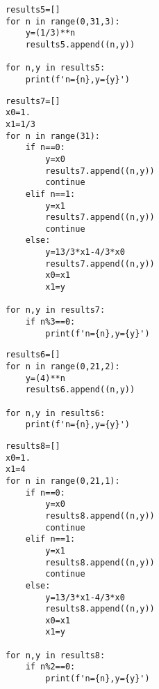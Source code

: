 \documentclass[UTF8,ctexart,a4paper,11pt,openany]{article}
\theoremstyle{definition}
\begin{document}
\begin{lstlisting}[aboveskip=0pt]
results5=[]
for n in range(0,31,3):
    y=(1/3)**n
    results5.append((n,y))

for n,y in results5:
    print(f'n={n},y={y}')
\end{lstlisting}
\begin{lstlisting}[aboveskip=0pt]
results7=[]
x0=1.
x1=1/3
for n in range(31):
    if n==0:
        y=x0
        results7.append((n,y))
        continue
    elif n==1:
        y=x1
        results7.append((n,y))
        continue
    else:
        y=13/3*x1-4/3*x0
        results7.append((n,y))
        x0=x1
        x1=y

for n,y in results7:
    if n%3==0:
        print(f'n={n},y={y}')
\end{lstlisting}
\begin{lstlisting}[aboveskip=0pt]
results6=[]
for n in range(0,21,2):
    y=(4)**n
    results6.append((n,y))

for n,y in results6:
    print(f'n={n},y={y}')
\end{lstlisting}
\begin{lstlisting}[aboveskip=0pt]
results8=[]
x0=1.
x1=4
for n in range(0,21,1):
    if n==0:
        y=x0
        results8.append((n,y))
        continue
    elif n==1:
        y=x1
        results8.append((n,y))
        continue
    else:
        y=13/3*x1-4/3*x0
        results8.append((n,y))
        x0=x1
        x1=y

for n,y in results8:
    if n%2==0:
        print(f'n={n},y={y}')
\end{lstlisting}
\clearpage



\end{document}
